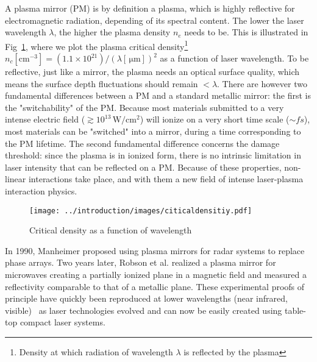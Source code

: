 A plasma mirror (PM) is by definition a plasma, which is highly reflective for electromagnetic radiation, depending of its spectral content. The lower the laser wavelength $\lambda$, the higher the plasma density $n_e$ needs to be. This is illustrated in Fig~\ref{fig:citicaldensitiy}, where we plot the plasma critical density\footnote{Density at which radiation of wavelength $\lambda$ is reflected by the plasma} $n_c [\mathrm{cm^{-3}}] = (1.1\times 10^{21})/(\lambda[\,\mathrm{\mu m}])^2$ as a function of laser wavelength. To be reflective, just like a mirror, the plasma needs an optical surface quality, which means the surface depth fluctuations should remain $<\lambda$. There are however two fundamental differences between a PM and a standard metallic mirror: the first is the "switchability" of the PM. Because most  materials submitted to a very intense electric field ($\gtrsim 10^{13}\,\mathrm{W/cm^2}$) will ionize on a very short time scale ($\sim fs$), most materials can be "switched" into a mirror, during a time corresponding to the PM lifetime. The second fundamental difference concerns the damage threshold: since the plasma is in ionized form, there is no intrinsic limitation in laser intensity that can be reflected on a PM. Because of these properties, non-linear interactions take place, and with them a new field of intense laser-plasma interaction physics. 





\begin{figure}[H]
\begin{center}
\texttt{[image: ../introduction/images/citicaldensitiy.pdf]}\\
\caption{\label{fig:citicaldensitiy}Critical density as a function of wavelength}
\end{center}
\end{figure}

 \noindent In 1990, Manheimer \cite{Manheimer1991} proposed using plasma mirrors for radar systems to replace phase arrays. Two years later, Robson et al. \cite{Robson1992} realized a plasma mirror for microwaves creating a partially ionized plane in a magnetic field and measured a reflectivity comparable to that of a metallic plane. These experimental proofs of principle have quickly been reproduced at lower wavelengths (near infrared, visible)~\cite{bach1983intensity,Kapteyn1991,nantel1998temporal,mathew1996generation,doumy2004complete,dromey2004plasma} as laser technologies evolved and can now be easily created using table-top compact laser systems. 




